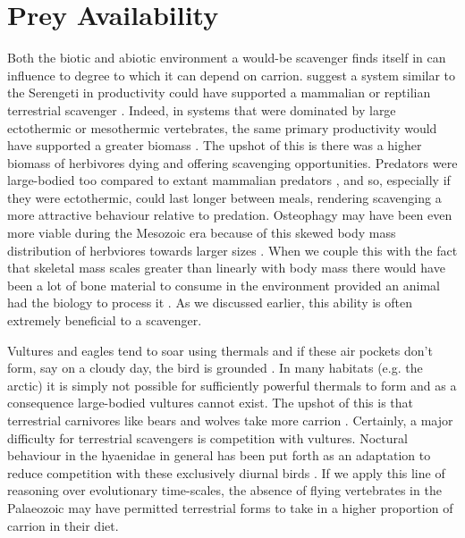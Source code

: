 \documentclass[a4paper,12pt]{article}
\begin{document}

\section*{Prey Availability}
Both the biotic and abiotic environment a would-be scavenger finds itself in can influence to degree to which it can depend on carrion. 
\cite{ruxton2004obligate} suggest a system similar to the Serengeti in productivity could have supported a mammalian or reptilian terrestrial scavenger \citep{ruxton2004obligate}.
Indeed, in systems that were dominated by large ectothermic or mesothermic vertebrates, 
the same primary productivity would have supported a greater biomass \citep{mcnab2009resources}.
The upshot of this is there was a higher biomass of herbivores dying and offering scavenging opportunities.
Predators were large-bodied too compared to extant mammalian predators \citep{mcnab2009resources}, and so, especially if they were ectothermic, could last longer between meals, rendering scavenging a more attractive behaviour relative to predation.
Osteophagy may have been even more viable during the Mesozoic era because of this skewed body mass distribution of herbviores towards larger sizes \citep{10.1371/journal.pone.0051925}.
When we couple this with the fact that skeletal mass scales greater than linearly with body mass \citep{prange1979scaling} there would have been a lot of bone material to consume in the environment provided an animal had the biology to process it \citep{chure1997one}.
As we discussed earlier, this ability is often extremely beneficial to a scavenger.



Vultures and eagles tend to soar using thermals and if these air pockets don't form, say on a cloudy day, the bird is grounded \citep{mundy1992vultures}.
In many habitats (e.g. the arctic) it is simply not possible for sufficiently powerful thermals to form and as a consequence large-bodied vultures cannot exist.
The upshot of this is that terrestrial carnivores like bears and wolves take more carrion \citep{devault2003scavenging}.
Certainly, a major difficulty for terrestrial scavengers is competition with vultures.
Noctural behaviour in the hyaenidae in general has been put forth as an adaptation to reduce competition with these exclusively diurnal birds \citep{gittleman2013carnivore}.
If we apply this line of reasoning over evolutionary time-scales, the absence of flying vertebrates in the Palaeozoic may have permitted terrestrial forms to take in a higher proportion of carrion in their diet.
\end{document}
